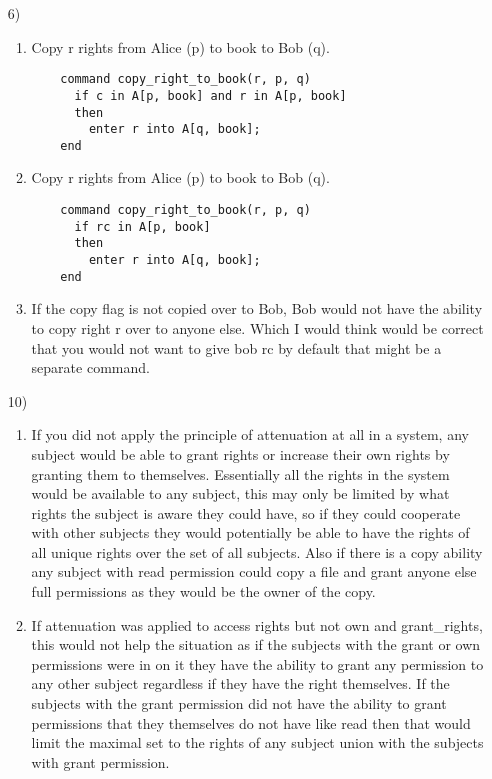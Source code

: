 \documentclass[journal,onecolumn]{IEEEtran}
\begin{document}
\begin{enumerate}
\begin{enumerate}
    \end{enumerate}
  \item [6)] 
  \begin{enumerate} 
    \item Copy r rights from Alice (p) to book to Bob (q).
    \begin{lstlisting}
    command copy_right_to_book(r, p, q)
      if c in A[p, book] and r in A[p, book]
      then
        enter r into A[q, book];
    end
    \end{lstlisting}
    \item Copy r rights from Alice (p) to book to Bob (q).
    \begin{lstlisting}
    command copy_right_to_book(r, p, q)
      if rc in A[p, book]
      then
        enter r into A[q, book];
    end
    \end{lstlisting}    
    \item If the copy flag is not copied over to Bob, Bob would not have the ability to copy right r over to anyone else. Which I would think would be correct that you would not want to give bob rc by default that might be a separate command. 
        \end{enumerate}
  \item [10)] 
  \begin{enumerate}
    \item If you did not apply the principle of attenuation at all in a system, any subject would be able to grant rights or increase their own rights by granting them to themselves. Essentially all the rights in the system would be available to any subject, this may only be limited by what rights the subject is aware they could have, so if they could cooperate with other subjects they would potentially be able to have the rights of all unique rights over the set of all subjects. Also if there is a copy ability any subject with read permission could copy a file and grant anyone else full permissions as they would be the owner of the copy. 
    \item If attenuation was applied to access rights but not own and grant\_rights, this would not help the situation as if the subjects with the grant or own permissions were in on it they have the ability to grant any permission to any other subject regardless if they have the right themselves. If the subjects with the grant permission did not have the ability to grant permissions that they themselves do not have like read then that would limit the maximal set to the rights of any subject union with the subjects with grant permission.

\end{enumerate}
\end{enumerate}
\end{document}

